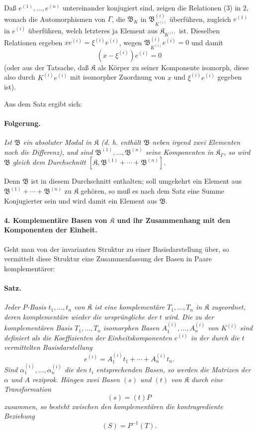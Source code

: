 Daß $e^{(1)},\ldots,e^{(n)}$ untereinander konjugiert sind, zeigen die Relationen (3) in 2, wonach die Automorphismen von $\Gamma$, die $\mathfrak B_K$ in $\mathfrak B_{K^{(i)}}^{(i)}$ überführen, zugleich $e^{(1)}$ in $e^{(i)}$ überführen, welch letzteres ja Element aus $\mathfrak K_{K^{(i)}}$ ist. Dieselben Relationen ergeben $xe^{(i)}=\xi^{(i)}e^{(i)}$, wegen $\mathfrak B_{K^{(i)}}^{(i)}e^{(i)}=0$ und damit
\[
(x-\xi^{(i)})e^{(i)}=0
\]
(oder aus der Tatsache, daß $\mathfrak K$ als Körper zu seiner Komponente isomorph, diese also durch $K^{(i)}e^{(i)}$ mit isomorpher Zuordnung von $x$ und $\xi^{(i)}e^{(i)}$ gegeben ist).

Aus dem Satz ergibt sich:

\paragraph{Folgerung.}
\emph{Ist $\mathfrak B$ ein absoluter Modul in $\mathfrak K$ (d. h. enthält $\mathfrak B$ neben irgend zwei Elementen noch die Differenz), und sind $\mathfrak B^{(1)},\ldots,\mathfrak B^{(n)}$ seine Komponenten in $\mathfrak K_\Gamma$, so wird $\mathfrak B$ gleich dem Durchschnitt $[\mathfrak K,\mathfrak B^{(1)}+\cdots+\mathfrak B^{(n)}]$.}

Denn $\mathfrak B$ ist in diesem Durchschnitt enthalten; soll umgekehrt ein Element aus $\mathfrak B^{(1)}+\cdots+\mathfrak B^{(n)}$ zu $\mathfrak K$ gehören, so muß es nach dem Satz eine Summe Konjugierter sein und wird damit ein Element aus $\mathfrak B$.

\paragraph{4. Komplementäre Basen von $\mathfrak K$ und ihr Zusammenhang mit den Komponenten der Einheit.}
Geht man von der invarianten Struktur zu einer Basisdarstellung über, so vermittelt diese Struktur eine Zusammenfassung der Basen in Paare komplementärer:

\paragraph{Satz.}
\emph{Jeder $P$-Basis $t_1,\ldots,t_n$ von $\mathfrak K$ ist eine komplementäre $T_1,\ldots,T_n$ in $\mathfrak K$ zugeordnet, deren komplementäre wieder die ursprüngliche der $t$ wird. Die zu der komplementären Basis $T_1,\ldots,T_n$ isomorphen Basen $A_1^{(i)},\ldots,A_n^{(i)}$ von $K^{(i)}$ sind definiert als die Koeffizienten der Einheitskomponenten $e^{(i)}$ in der durch die $t$ vermittelten Basisdarstellung
\[
e^{(i)}=A_1^{(i)}t_1+\cdots+A_n^{(i)}t_n.
\]
Sind $\alpha_1^{(i)},\ldots,\alpha_n^{(i)}$ die den $t_i$ entsprechenden Basen, so werden die Matrizen der $\alpha$ und $A$ reziprok. Hängen zwei Basen $(s)$ und $(t)$ von $\mathfrak K$ durch eine Transformation
\[
(s)=(t)P
\]
zusammen, so besteht zwischen den komplementären die kontragrediente Beziehung
\[
(S)=P^{-1}(T).
\]}

